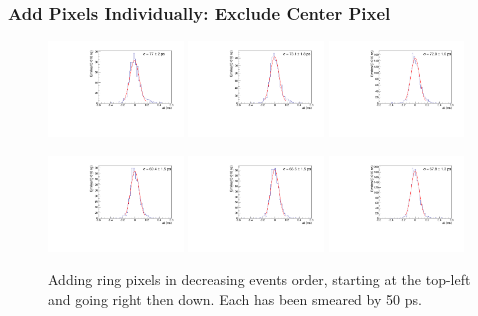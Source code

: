 \documentclass[twocolumn,aps,prd,reprint,superscriptaddress,floatfix]{revtex4-1}
\begin{document}
\subsubsection{Add Pixels Individually: Exclude Center Pixel}
\begin{figure}[!htbp]
\centering
	\includegraphics[width=0.32\textwidth]{SKIROC_1_Pixels_NoCenter50.pdf}
	\includegraphics[width=0.32\textwidth]{SKIROC_2_Pixels_NoCenter50.pdf}
	\includegraphics[width=0.32\textwidth]{SKIROC_3_Pixels_NoCenter50.pdf}

	\includegraphics[width=0.32\textwidth]{SKIROC_4_Pixels_NoCenter50.pdf}
	\includegraphics[width=0.32\textwidth]{SKIROC_5_Pixels_NoCenter50.pdf}
	\includegraphics[width=0.32\textwidth]{SKIROC_6_Pixels_NoCenter50.pdf}
	\caption{Adding ring pixels in decreasing events order, starting at the top-left and going right then down.
		Each has been smeared by 50 ps.}
	\label{fig:50psAll_NoCenter}
\end{figure}
\end{document}
